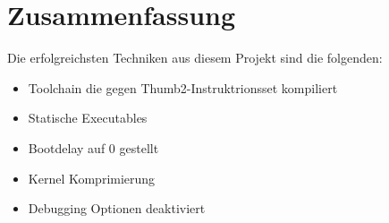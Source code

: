 
\section{Zusammenfassung}
Die erfolgreichsten Techniken aus diesem Projekt sind die folgenden:
\begin{itemize}
	\item Toolchain die gegen Thumb2-Instruktrionsset kompiliert
	\item Statische Executables
	\item Bootdelay auf 0 gestellt
	\item Kernel Komprimierung
	\item Debugging Optionen deaktiviert
\end{itemize}

